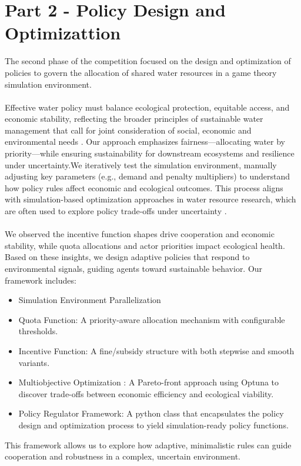 \documentclass[ruler]{CUP-JNL-EDS}%
\begin{document}
\section{Part 2 - Policy Design and Optimizattion}
The second phase of the competition focused on the design and optimization of policies to govern the 
allocation of shared water resources in a game theory simulation environment.
\\ \\
Effective water policy must balance ecological protection, equitable access, and economic stability, reflecting 
the broader principles of sustainable water management that call for joint consideration of social, economic and environmental 
needs \citep{wang2025}. 
Our approach emphasizes fairness—allocating water by priority—while ensuring sustainability for downstream ecosystems and resilience 
under uncertainty.We iteratively test the simulation environment, manually adjusting key parameters (e.g., demand and penalty multipliers) 
to understand how policy rules affect economic and ecological outcomes. This process aligns with simulation-based optimization approaches in 
water resource research, which are often used to explore policy trade-offs under uncertainty \citep{tian2019,tang2021,fu2020}. 
\\ \\
We observed the incentive function shapes drive cooperation and economic stability, while quota allocations and actor priorities impact ecological health.
Based on these insights, we design adaptive policies that respond to environmental signals, guiding agents toward 
sustainable behavior. Our framework includes:
\begin{itemize}
    \item Simulation Environment Parallelization
    \item Quota Function: A priority-aware allocation mechanism with configurable thresholds.
    \item Incentive Function: A fine/subsidy structure with both stepwise and smooth variants.
    \item Multiobjective Optimization : A Pareto-front approach using Optuna to discover trade-offs between economic efficiency and ecological viability.
    \item Policy Regulator Framework: A python class that encapsulates the policy design and optimization process to yield simulation-ready policy functions.  
\end{itemize}
\noindent This framework allows us to explore how adaptive, minimalistic rules can guide cooperation and robustness in a complex, uncertain environment.
\end{document}
